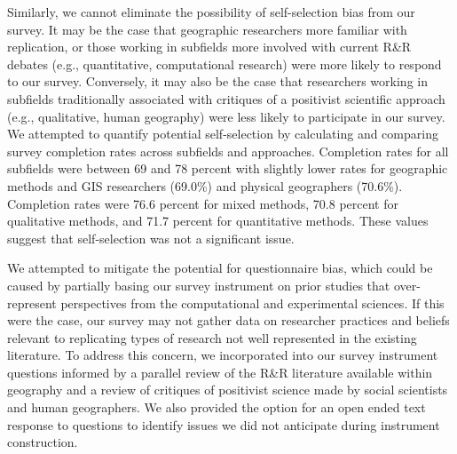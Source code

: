 \documentclass[]{interact}
\theoremstyle{plain}%
\theoremstyle{definition}
\theoremstyle{remark}
\begin{document}
Similarly, we cannot eliminate the possibility of self-selection bias from our survey. 
It may be the case that geographic researchers more familiar with replication, or those working in subfields more involved with current R\&R debates (e.g., quantitative, computational research) were more likely to respond to our survey. 
Conversely, it may also be the case that researchers working in subfields traditionally associated with critiques of a positivist scientific approach (e.g., qualitative, human geography) were less likely to participate in our survey. 
We attempted to quantify potential self-selection by calculating and comparing survey completion rates across subfields and approaches. 
Completion rates for all subfields were between 69 and 78 percent with slightly lower rates for geographic methods and GIS researchers (69.0\%) and physical geographers (70.6\%).
Completion rates were 76.6 percent for mixed methods, 70.8 percent for qualitative methods, and 71.7 percent for quantitative methods. 
These values suggest that self-selection was not a significant issue.

We attempted to mitigate the potential for questionnaire bias, which could be caused by partially basing our survey instrument on prior studies that over-represent perspectives from the computational and experimental sciences.
If this were the case, our survey may not gather data on researcher practices and beliefs relevant to replicating types of research not well represented in the existing literature. 
To address this concern, we incorporated into our survey instrument questions informed by a parallel review of the R\&R literature available within geography and a review of critiques of positivist science made by social scientists and human geographers.
We also provided the option for an open ended text response to questions to identify issues we did not anticipate during instrument construction.  
\end{document}
